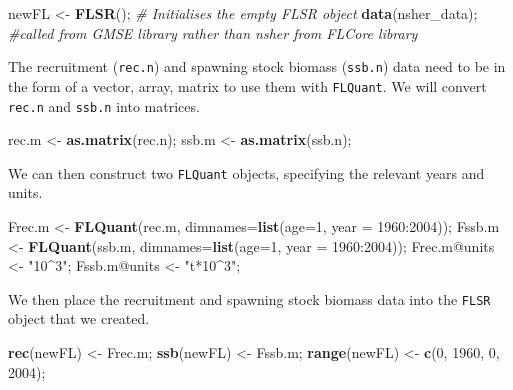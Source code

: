 \documentclass[]{article}
\newenvironment{Shaded}{\begin{snugshade}}{\end{snugshade}}
\newcommand{\KeywordTok}[1]{\textcolor[rgb]{0.13,0.29,0.53}{\textbf{{#1}}}}
\newcommand{\DataTypeTok}[1]{\textcolor[rgb]{0.13,0.29,0.53}{{#1}}}
\newcommand{\DecValTok}[1]{\textcolor[rgb]{0.00,0.00,0.81}{{#1}}}
\newcommand{\StringTok}[1]{\textcolor[rgb]{0.31,0.60,0.02}{{#1}}}
\newcommand{\CommentTok}[1]{\textcolor[rgb]{0.56,0.35,0.01}{\textit{{#1}}}}
\newcommand{\NormalTok}[1]{{#1}}
\begin{document}
\begin{Shaded}
\begin{Highlighting}[]
\NormalTok{newFL   <-}\StringTok{ }\KeywordTok{FLSR}\NormalTok{(); }\CommentTok{# Initialises the empty FLSR object}
\KeywordTok{data}\NormalTok{(nsher_data); }\CommentTok{#called from GMSE library rather than nsher from FLCore library}
\end{Highlighting}
\end{Shaded}

The recruitment (\texttt{rec.n}) and spawning stock biomass
(\texttt{ssb.n}) data need to be in the form of a vector, array, matrix
to use them with \texttt{FLQuant}. We will convert \texttt{rec.n} and
\texttt{ssb.n} into matrices.

\begin{Shaded}
\begin{Highlighting}[]
\NormalTok{rec.m        <-}\StringTok{ }\KeywordTok{as.matrix}\NormalTok{(rec.n);}
\NormalTok{ssb.m        <-}\StringTok{ }\KeywordTok{as.matrix}\NormalTok{(ssb.n);}
\end{Highlighting}
\end{Shaded}

We can then construct two \texttt{FLQuant} objects, specifying the
relevant years and units.

\begin{Shaded}
\begin{Highlighting}[]
\NormalTok{Frec.m       <-}\StringTok{ }\KeywordTok{FLQuant}\NormalTok{(rec.m, }\DataTypeTok{dimnames=}\KeywordTok{list}\NormalTok{(}\DataTypeTok{age=}\DecValTok{1}\NormalTok{, }\DataTypeTok{year =} \DecValTok{1960}\NormalTok{:}\DecValTok{2004}\NormalTok{));}
\NormalTok{Fssb.m       <-}\StringTok{ }\KeywordTok{FLQuant}\NormalTok{(ssb.m, }\DataTypeTok{dimnames=}\KeywordTok{list}\NormalTok{(}\DataTypeTok{age=}\DecValTok{1}\NormalTok{, }\DataTypeTok{year =} \DecValTok{1960}\NormalTok{:}\DecValTok{2004}\NormalTok{));}
\NormalTok{Frec.m@units <-}\StringTok{ "10^3"}\NormalTok{;}
\NormalTok{Fssb.m@units <-}\StringTok{ "t*10^3"}\NormalTok{;}
\end{Highlighting}
\end{Shaded}

We then place the recruitment and spawning stock biomass data into the
\texttt{FLSR} object that we created.

\begin{Shaded}
\begin{Highlighting}[]
\KeywordTok{rec}\NormalTok{(newFL)    <-}\StringTok{ }\NormalTok{Frec.m;}
\KeywordTok{ssb}\NormalTok{(newFL)    <-}\StringTok{ }\NormalTok{Fssb.m;}
\KeywordTok{range}\NormalTok{(newFL)  <-}\StringTok{ }\KeywordTok{c}\NormalTok{(}\DecValTok{0}\NormalTok{, }\DecValTok{1960}\NormalTok{, }\DecValTok{0}\NormalTok{, }\DecValTok{2004}\NormalTok{);}
\end{Highlighting}
\end{Shaded}
\end{document}

